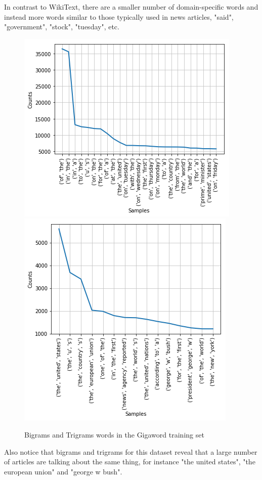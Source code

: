 \documentclass[a4paper]{article}
\begin{document}
In contrast to WikiText, there are a smaller number of domain-specific
words and instead more words similar to those typically used in news
articles, "said", "government", "stock", "tuesday", etc.

\begin{figure}[!ht]
\includegraphics[width=0.8\columnwidth]{sr-eda-gigaword-bigrams}
\includegraphics[width=0.8\columnwidth]{sr-eda-gigaword-trigrams}
\centering
\caption{Bigrams and Trigrams words in the Gigaword training set}
\end{figure}

Also notice that bigrams and trigrams for this dataset reveal that a
large number of articles are talking about the same thing, for instance
"the united states", "the european union" and "george w bush".
\end{document}
